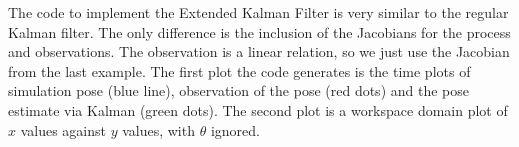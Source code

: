 \begin{Shaded}
\begin{Highlighting}[]
\OperatorTok{=} 
\OperatorTok{\textless{}=}
\OperatorTok{=}\OperatorTok{,} \NormalTok{)}\OperatorTok{,}\NormalTok{)}
\OperatorTok{=}\OperatorTok{,} \NormalTok{)}\OperatorTok{,}\NormalTok{)}
\NormalTok{  x[k}\OperatorTok{,}\NormalTok{] }\OperatorTok{=}\NormalTok{ x[k}\OperatorTok{{-}}\OperatorTok{,}\NormalTok{] }\OperatorTok{+}\OperatorTok{*}\OperatorTok{+}\OperatorTok{*}\NormalTok{cos(x[k}\OperatorTok{{-}}\OperatorTok{,}\NormalTok{]) }\OperatorTok{+}\NormalTok{ q[}\NormalTok{]}
\NormalTok{  x[k}\OperatorTok{,}\NormalTok{] }\OperatorTok{=}\NormalTok{ x[k}\OperatorTok{{-}}\OperatorTok{,}\NormalTok{] }\OperatorTok{+}\OperatorTok{*}\OperatorTok{+}\OperatorTok{*}\NormalTok{sin(x[k}\OperatorTok{{-}}\OperatorTok{,}\NormalTok{]) }\OperatorTok{+}\NormalTok{ q[}\NormalTok{]}
\NormalTok{  x[k}\OperatorTok{,}\NormalTok{] }\OperatorTok{=}\NormalTok{ x[k}\OperatorTok{{-}}\OperatorTok{,}\NormalTok{] }\OperatorTok{+}\OperatorTok{*}\OperatorTok{{-}}\OperatorTok{/}\OperatorTok{+}\NormalTok{ q[}\NormalTok{]}
\NormalTok{  z[k}\OperatorTok{,}\NormalTok{] }\OperatorTok{=}\NormalTok{ x[k}\OperatorTok{,}\NormalTok{] }\OperatorTok{+}\NormalTok{ r[}\NormalTok{]}
\NormalTok{  z[k}\OperatorTok{,}\NormalTok{] }\OperatorTok{=}\NormalTok{ x[k}\OperatorTok{,}\NormalTok{] }\OperatorTok{+}\NormalTok{ r[}\NormalTok{]}
\NormalTok{  z[k}\OperatorTok{,}\NormalTok{] }\OperatorTok{=}\NormalTok{ x[k}\OperatorTok{,}\NormalTok{] }\OperatorTok{+}\NormalTok{ r[}\NormalTok{]}
\OperatorTok{=}\OperatorTok{+}
\end{Highlighting}
\end{Shaded}

The code to implement the Extended Kalman Filter is very similar to the
regular Kalman filter. The only difference is the inclusion of the
Jacobians for the process and observations. The observation is a linear
relation, so we just use the Jacobian from the last example. The first
plot the code generates is the time plots of simulation pose (blue
line), observation of the pose (red dots) and the pose estimate via
Kalman (green dots). The second plot is a workspace domain plot of \(x\)
values against \(y\) values, with \(\theta\) ignored.

